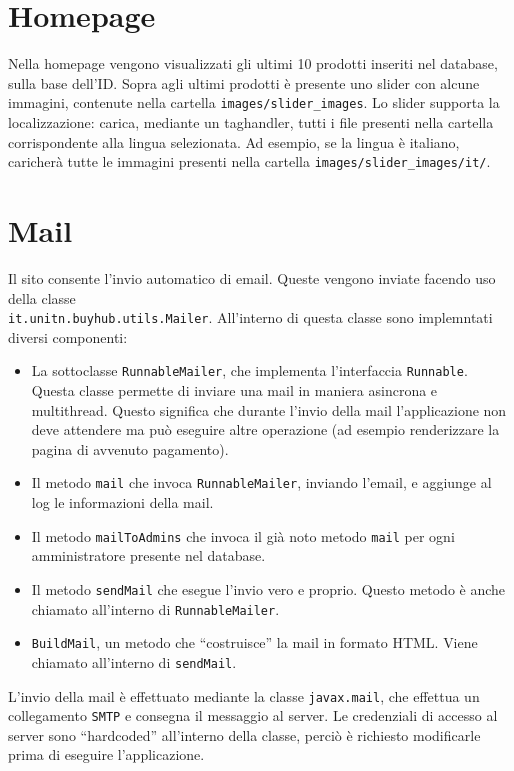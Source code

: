 \chapter{Homepage}
Nella homepage vengono visualizzati gli ultimi 10 prodotti inseriti nel database, sulla base dell'ID. Sopra agli ultimi prodotti è presente uno slider con alcune immagini, contenute nella cartella \texttt{images/slider\_images}. Lo slider supporta la localizzazione: carica, mediante un taghandler, tutti i file presenti nella cartella corrispondente alla lingua selezionata. Ad esempio, se la lingua è italiano, caricherà tutte le immagini presenti nella cartella \texttt{images/slider\_images/it/}.


\chapter{Mail}
Il sito consente l'invio automatico di email. Queste vengono inviate facendo uso della classe \\\texttt{it.unitn.buyhub.utils.Mailer}.
All'interno di questa classe sono implemntati diversi componenti:
\begin{itemize}
  \item La sottoclasse \texttt{RunnableMailer}, che implementa l'interfaccia \texttt{Runnable}. Questa classe permette di inviare una mail in maniera asincrona e multithread. Questo significa che durante l'invio della mail l'applicazione non deve attendere ma può eseguire altre operazione (ad esempio renderizzare la pagina di avvenuto pagamento).
  \item Il metodo \texttt{mail} che invoca \texttt{RunnableMailer}, inviando l'email, e aggiunge al log le informazioni della mail.
  \item Il metodo \texttt{mailToAdmins} che invoca il già noto metodo \texttt{mail} per ogni amministratore presente nel database.
  \item Il metodo \texttt{sendMail} che esegue l'invio vero e proprio. Questo metodo è anche chiamato all'interno di \texttt{RunnableMailer}.
  \item \texttt{BuildMail}, un metodo che ``costruisce'' la mail in formato HTML. Viene chiamato all'interno di \texttt{sendMail}.
\end{itemize}

L'invio della mail è effettuato mediante la classe \texttt{javax.mail}, che effettua un collegamento \texttt{SMTP} e consegna il messaggio al server. Le credenziali di accesso al server sono ``hardcoded'' all'interno della classe, perciò è richiesto modificarle prima di eseguire l'applicazione.

